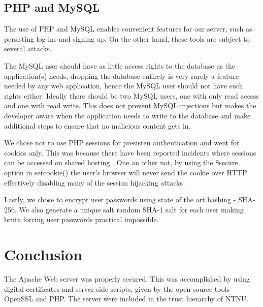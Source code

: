 \documentclass[a4paper, 12pt]{article}
\begin{document}
\subsection{PHP and MySQL}
The use of PHP and MySQL enables convenient features for our server, such as persisting log-ins and signing up. On the other hand, these tools are subject to several attacks. 

The MySQL user should have as little access rights to the database as the application(s) needs, dropping the database entirely is very rarely a feature needed by any web application, hence the MySQL user should not have such rights either. Ideally there should be two MySQL users, one with only read access and one with read write. This does not prevent MySQL injections but makes the developer aware when the application needs to write to the database and make additional steps to ensure that no malicious content gets in.

We chose not to use PHP sessions for presisten authentication and went for cookies only. This was because there have been reported incidents where sessions can be accessed on shared hosting \cite{atte}. One an other not, by using the \$secure option in setcookie() the user’s browser will never send the cookie over HTTP effectively disabling many of the session hijacking attacks \cite{ni}. 

Lastly, we chose to encrypt user passwords using state of the art hashing - SHA-256. We also generate a unique salt random SHA-1 salt for each user making brute forcing user passwords practical impossible. 

\section{Conclusion}
The Apache Web server was properly secured. This was accomplished by using digital certificates and server side scripts, given by the open source tools OpenSSL and PHP. The server were included in the trust hierarchy of NTNU.


\newpage
\renewcommand*{\bibname}{\vspace{-20pt}\section{References}\vspace{-20pt}}


\end{document}
